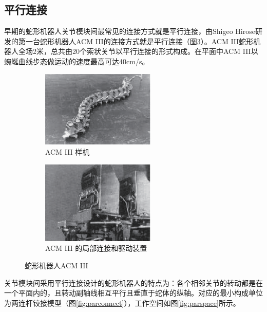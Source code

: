 \subsection{平行连接}
早期的蛇形机器人关节模块间最常见的连接方式就是平行连接，由Shigeo Hirose研发的第一台蛇形机器人ACM III的连接方式就是平行连接\cite{Endo1999Study}（图\ref{fig:ACM}）。ACM III蛇形机器人全场2米，总共由20个索状关节以平行连接的形式构成。在平面中ACM III以蜿蜒曲线步态做运动的速度最高可达40cm/s。
\begin{figure}[h!] %
	\begin{subfigure}{0.5\textwidth}
		\centering
		\includegraphics[width=0.6\textwidth,height=0.15\textheight]{figure/chap03/ACMIII.eps}
		\caption{ACM III 样机}
		\label{fig:ACMIII}
	\end{subfigure}
	\begin{subfigure}{0.5\textwidth}
		\centering
		\includegraphics[width=0.6\textwidth,height=0.15\textheight]{figure/chap03/ACMs.eps}
		\caption{ACM III 的局部连接和驱动装置}
		\label{fig:ACMS}
	\end{subfigure}
	\caption{蛇形机器人ACM III}
	\label{fig:ACM}
\end{figure}
关节模块间采用平行连接设计的蛇形机器人的特点为：各个相邻关节的转动都是在一个平面内的，且转动副轴线相互平行且垂直于蛇体的纵轴。对应的最小构成单位为两连杆铰接模型（图\ref{fig:parconnect}），工作空间如图\ref{fig:parspace}所示。
